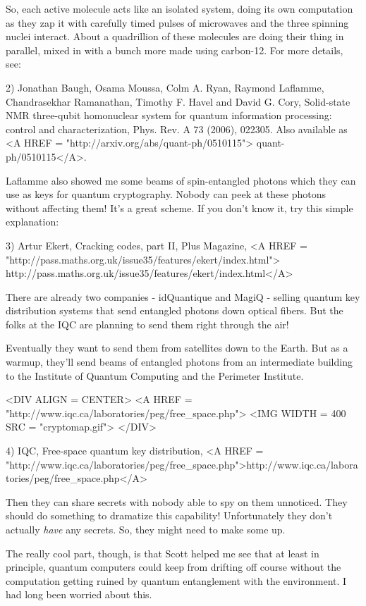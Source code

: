 So, each active molecule acts like an isolated system, doing its own 
computation as they zap it with carefully timed pulses of 
microwaves and the three spinning nuclei interact.  About a quadrillion of 
these molecules are doing their thing in parallel, mixed
in with a bunch more made using carbon-12.  For more details, see:

2) Jonathan Baugh, Osama Moussa, Colm A. Ryan, Raymond Laflamme, 
Chandrasekhar Ramanathan, Timothy F. Havel and David G. Cory,
Solid-state NMR three-qubit homonuclear system for quantum information 
processing: control and characterization, Phys. Rev. A 73 (2006), 022305. 
Also available as <A HREF = "http://arxiv.org/abs/quant-ph/0510115">
quant-ph/0510115</A>.

Laflamme also showed me some beams of spin-entangled photons which
they can use as keys for quantum cryptography.  Nobody can peek
at these photons without affecting them!  It's a great scheme.
If you don't know it, try this simple explanation:

3) Artur Ekert, Cracking codes, part II, Plus Magazine,
<A HREF = "http://pass.maths.org.uk/issue35/features/ekert/index.html">
http://pass.maths.org.uk/issue35/features/ekert/index.html</A>

There are already two companies - idQuantique and MagiQ - selling 
quantum key distribution systems that send entangled photons 
down optical fibers.  But the folks at the IQC are planning to
send them right through the air!

Eventually they want to send them from satellites down to the 
Earth.  But as a warmup, they'll send beams of entangled photons 
from an intermediate building to the Institute of Quantum Computing 
and the Perimeter Institute.

<DIV ALIGN = CENTER>
<A HREF = "http://www.iqc.ca/laboratories/peg/free_space.php">
<IMG WIDTH = 400 SRC = "cryptomap.gif">
</DIV>

4) IQC, Free-space quantum key distribution, 
<A HREF = "http://www.iqc.ca/laboratories/peg/free_space.php">http://www.iqc.ca/laboratories/peg/free_space.php</A>

Then they can share secrets with 
nobody able to spy on them unnoticed.  They should do something to 
dramatize this capability!  Unfortunately they don't actually \emph{have} 
any secrets.  So, they might need to make some up.

The really cool part, though, is that Scott helped me see that
at least in principle, quantum computers could keep from drifting
off course without the computation getting ruined by quantum 
entanglement with the environment.  I had long been worried about 
this.  

